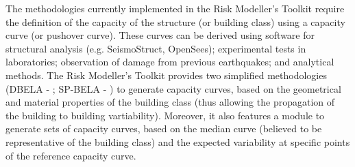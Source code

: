 The methodologies currently implemented in the Risk Modeller's Toolkit require the definition of the capacity of the structure (or building class) using a capacity curve (or pushover curve). These curves can be derived using software for structural analysis (e.g. SeismoStruct, OpenSees); experimental tests in laboratories; observation of damage from previous earthquakes; and analytical methods. The Risk Modeller's Toolkit provides two simplified methodologies (DBELA - \cite{SilvaEtAl2013}; SP-BELA - \cite{BorziEtAl2008b}) to generate capacity curves, based on the geometrical and material properties of the building class (thus allowing the propagation of the building to building vartiability). Moreover, it also features a module to generate sets of capacity curves, based on the median curve (believed to be representative of the building class) and the expected variability at specific points of the reference capacity curve.